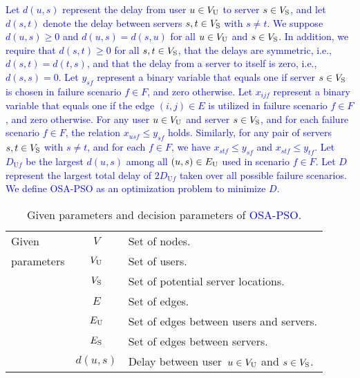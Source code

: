 \documentclass[10pt, letterpaper]{IEEEtran}
\newcommand\blue[1]{\textcolor{blue}{#1}}
\begin{document}
\begin{CJK}{UTF8}{ipxm}
\blue{
Let $d(u,s)$ represent the delay from user $u \in V_{\rm{U}}$ to server $s \in V_{\rm{S}}$, and let $d(s,t)$ denote the delay between servers $s, t \in V_{\rm{S}}$ with $s \neq t$.
We suppose $d(u,s) \geq 0$ and $d(u,s) = d(s,u)$ for all $u \in V_{\rm{U}}$ and $s \in V_{\rm{S}}$.
In addition, we require that $d(s,t) \geq 0$ for all $s, t \in V_{\rm{S}}$, that the delays are symmetric, i.e., $d(s,t) = d(t,s)$, and that the delay from a server to itself is zero, i.e., $d(s,s) = 0$.
Let $y_{sf}$ represent a binary variable that equals one if server $s \in V_{\rm{S}}$ is chosen in failure scenario $f \in F$, and zero otherwise.
Let $x_{ijf}$ represent a binary variable that equals one if the edge $(i,j) \in E$ is utilized in failure scenario $f \in F$, and zero otherwise.
For any user $u \in V_{\rm{U}}$ and server $s \in V_{\rm{S}}$, and for each failure scenario $f \in F$, the relation $x_{usf} \le y_{sf}$ holds. 
Similarly, for any pair of servers $s, t \in V_{\rm{S}}$ with $s \neq t$, and for each $f \in F$, we have $x_{stf} \le y_{sf}$ and $x_{stf} \le y_{tf}$. 
Let $D_{\mathrm{U}f}$ be the largest $d(u,s)$ among all $(u,s) \in E_{\rm{U}}$ used in scenario $f \in F$.
Let $D$ represent the largest total delay of $2D_{\mathrm{U}f}$ taken over all possible failure scenarios.
We define OSA-PSO as an optimization problem to minimize $D$.
% 
\begin{table}[tb]
    \centering
    \caption{Given parameters and decision parameters of \blue{OSA-PSO}.}
    \label{tbl:notation_OSA-PSO}
    \begin{tabular}{p{1.3cm}|cp{5.4cm}}
        \hline
        \small
        Given & $V$ & Set of nodes. \\
        parameters & $V_{\rm{U}}$ & Set of users. \\
        & $V_{\rm{S}}$ & Set of potential server locations. \\
        & $E$ & Set of edges. \\
        & $E_{\rm{U}}$ & Set of edges between users and servers. \\
        & $E_{\rm{S}}$ & Set of edges between servers. \\
        & $d(u,s)$ & Delay between user~$u \in V_{\rm{U}}$ and $s \in V_{\rm{S}}$. \\

\end{tabular}
\end{table}}
\end{CJK}
\end{document}
